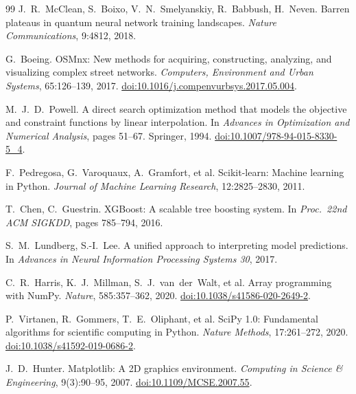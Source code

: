 \documentclass[journal]{IEEEtran}
\begin{document}
\begin{thebibliography}{99}
J.~R.~McClean, S.~Boixo, V.~N.~Smelyanskiy, R.~Babbush, H.~Neven.
Barren plateaus in quantum neural network training landscapes.
\emph{Nature Communications}, 9:4812, 2018.

G.~Boeing.
OSMnx: New methods for acquiring, constructing, analyzing, and visualizing
complex street networks.
\emph{Computers, Environment and Urban Systems}, 65:126--139, 2017.
\href{https://doi.org/10.1016/j.compenvurbsys.2017.05.004}{doi:10.1016/j.compenvurbsys.2017.05.004}.

M.~J.~D.~Powell.
A direct search optimization method that models the objective and constraint
functions by linear interpolation.
In \emph{Advances in Optimization and Numerical Analysis}, pages 51--67.
Springer, 1994.
\href{https://doi.org/10.1007/978-94-015-8330-5_4}{doi:10.1007/978-94-015-8330-5\_4}.

F.~Pedregosa, G.~Varoquaux, A.~Gramfort, et al.
Scikit-learn: Machine learning in Python.
\emph{Journal of Machine Learning Research}, 12:2825--2830, 2011.

T.~Chen, C.~Guestrin.
XGBoost: A scalable tree boosting system.
In \emph{Proc.\ 22nd ACM SIGKDD}, pages 785--794, 2016.

S.~M.~Lundberg, S.-I.~Lee.
A unified approach to interpreting model predictions.
In \emph{Advances in Neural Information Processing Systems 30}, 2017.

C.~R.~Harris, K.~J.~Millman, S.~J.~van~der~Walt, et al.
Array programming with NumPy.
\emph{Nature}, 585:357--362, 2020.
\href{https://doi.org/10.1038/s41586-020-2649-2}{doi:10.1038/s41586-020-2649-2}.

P.~Virtanen, R.~Gommers, T.~E.~Oliphant, et al.
SciPy 1.0: Fundamental algorithms for scientific computing in Python.
\emph{Nature Methods}, 17:261--272, 2020.
\href{https://doi.org/10.1038/s41592-019-0686-2}{doi:10.1038/s41592-019-0686-2}.

J.~D.~Hunter.
Matplotlib: A 2D graphics environment.
\emph{Computing in Science \& Engineering}, 9(3):90--95, 2007.
\href{https://doi.org/10.1109/MCSE.2007.55}{doi:10.1109/MCSE.2007.55}.

\end{thebibliography}
\end{document}
